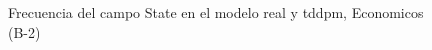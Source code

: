 \begin{figure}[H]
    \centering
    
    \caption{Frecuencia del campo State en el modelo real y tddpm, Economicos (B-2)}
    \label{frecuency-State-tddpm_mlp}
\end{figure}